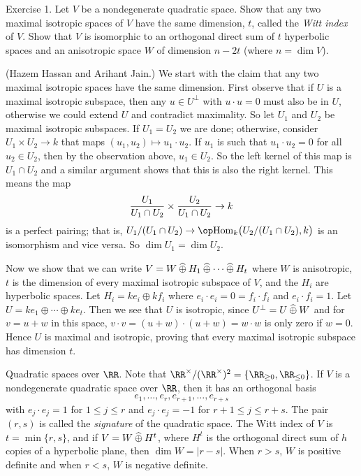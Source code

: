 \nineproclaim
Exercise 1. Let $V$ be a nondegenerate quadratic space. Show that any two maximal isotropic
spaces of $V$ have the same dimension, $t$, called the {\it Witt index} of $V$. Show that $V$ is isomorphic
to an orthogonal direct sum of $t$ hyperbolic spaces and an anisotropic space $W$ of dimension $n-2t$
(where $n = \dim V$).

\nineproof (Hazem Hassan and Arihant Jain.)
We start with the claim that any two maximal isotropic spaces have the same dimension. First observe
that if $U$ is a maximal isotropic subspace, then any $u\in U^\perp$ with $u\cdot u =0$ must also be in $U$,
otherwise we could extend $U$ and contradict maximality. So let $U_1$ and $U_2$ be maximal isotropic
subspaces. If $U_1 = U_2$ we are done; otherwise,
consider $U_1\times U_2\to k$ that maps $(u_1, u_2)\mapsto u_1\cdot u_2$. If $u_1$
is such that $u_1\cdot u_2 = 0$ for all $u_2\in U_2$, then by the observation above, $u_1\in U_2$. So the
left kernel of this map is $U_1\cap U_2$ and a similar argument shows that this is also the right kernel.
This means the map
$${U_1\over U_1\cap U_2} \times  {U_2\over U_1\cap U_2} \to k$$
is a perfect pairing; that is, $U_1/(U_1\cap U_2)\to \Hom_k\bigl(U_2/(U_1\cap U_2), k\bigr)$ is an isomorphism
and vice versa. So $\dim U_1 = \dim U_2$.

Now we show that we can write $V = W \mathbin{\widehat\oplus} H_1 \mathbin{\widehat\oplus} \cdots \mathbin{\widehat\oplus} H_t$ where $W$ is anisotropic, $t$
is the dimension of every maximal isotropic subspace of $V$, and the $H_i$
are hyperbolic spaces. Let $H_i = ke_i\oplus kf_i$ where $e_i\cdot e_i = 0 = f_i\cdot f_i$ and $e_i\cdot f_i = 1$.
Let $U = ke_1\oplus \cdots \oplus ke_t$. Then we see that $U$ is isotropic, since $U^\perp = U\mathbin{\widehat\oplus} W$
and for $v = u+w$ in this space, $v\cdot v = (u+w)\cdot (u+w) = w\cdot w$ is only zero if $w=0$. Hence $U$
is maximal and isotropic, proving that every maximal isotropic subspace has dimension $t$.\slug

\boldlabel Quadratic spaces over $\RR$. Note that $\RR^\times/(\RR^\times)^2 = \{\RR_{\ge 0}, \RR_{\le 0}\}$.
If $V$ is a nondegenerate quadratic space over $\RR$, then it has
an orthogonal basis
$$e_1,\ldots, e_r, e_{r+1}, \ldots, e_{r+s}$$
with $e_j\cdot e_j = 1$ for $1\le j\le r$
and $e_j\cdot e_j = -1$ for $r+1\le j\le r+s$. The pair $(r,s)$ is called the {\it signature} of the quadratic
space. The Witt index of $V$ is $t= \min\{r,s\}$, and if $V = W\mathbin{\widehat\oplus} H^t$, where $H^t$ is the orthogonal
direct sum of $h$ copies of a hyperbolic plane, then $\dim W = |r-s|$. When $r>s$,
$W$ is positive definite and when $r<s$, $W$ is negative definite.

